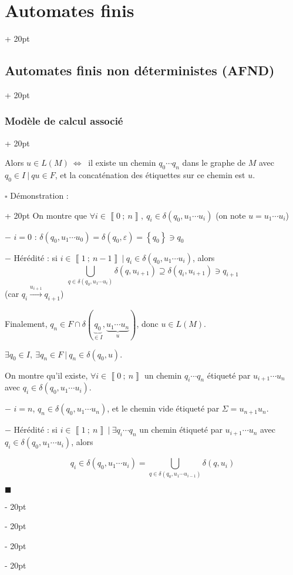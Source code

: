 \documentclass[a4paper, 12pt, twoside]{article}
\newcommand{\nset}[2]{\left\llbracket #1\ ;\ #2 \right\rrbracket}
\newcommand{\set}[1]{\left\{ #1 \right\}}
\newcommand{\ssi}{\ \Leftrightarrow \ }
\newcommand{\ind}[1][20pt]{\advance\leftskip + #1}
\newcommand{\deind}[1][20pt]{\advance\leftskip - #1}
\newenvironment{indt}[2][20pt]{#2 \par \ind[#1]}{\par \deind} %
\newenvironment{proof}[1][{Démonstration :}]{\begin{indt}{$\square$ #1}}{$\blacksquare$ \end{indt}}
\begin{document}
\begin{indt}{\section{Automates finis}}
\begin{indt}{\subsection{Automates finis non déterministes (AFND)}}
\begin{indt}{\subsubsection{Modèle de calcul associé}}
\begin{emphBox}
                    Alors $u \in L(M) \ssi$ il existe un chemin $q_0 \cdots q_n$ dans le graphe de $M$ avec $q_0 \in I\ |\ qu \in F$, et la concaténation des étiquettes sur ce chemin est $u$.
                \end{emphBox}

                \vspace{6pt}
                
                \begin{proof}
                    \boxed{\Leftarrow} On montre que $\forall i \in \nset 0 n,\ q_i \in \delta(q_0, u_1 \cdots u_i)$ (on note $u = u_1 \cdots u_i$)

                    $-$ $i = 0$ : $\delta(q_0, u_1 \cdots u_0) = \delta(q_0, \varepsilon) = \set{q_0} \ni q_0$

                    $-$ Hérédité : si $i \in \nset 1 {n - 1}\ |\ q_i \in \delta(q_0, u_1 \cdots u_i)$, alors
                    \[
                        \bigcup_{q \in \delta(q_0, u_1 \cdots u_i)} \delta(q, u_{i + 1}) \supseteq \delta(q_i, u_{i + 1}) \ni q_{i + 1}
                    \]
                    (car $q_i \overset{u_{i + 1}}\longrightarrow q_{i + 1}$)

                    Finalement, $q_n \in F \cap \delta(\underbrace{q_0}_{\in I}, \underbrace{u_1 \cdots u_n}_u)$, donc $u \in L(M)$.

                    \vspace{12pt}
                    
                    \boxed{\Rightarrow} $\exists q_0 \in I,\ \exists q_n \in F\ |\ q_n \in \delta(q_0, u)$.

                    On montre qu'il existe, $\forall i \in \nset 0 n$ un chemin $q_i \cdots q_n$ étiqueté par $u_{i + 1} \cdots u_n$ avec $q_i \in \delta(q_0, u_1 \cdots u_i)$.

                    \vspace{6pt}
                    
                    $-$ $i = n$, $q_n \in \delta(q_0, u_1 \cdots u_n)$, et le chemin vide étiqueté par $\Sigma = u_{n + 1}u_n$.

                    \vspace{6pt}
                    
                    $-$ Hérédité : si $i \in \nset 1 n\ |\ \exists q_i \cdots q_n$ un chemin étiqueté par $u_{i + 1} \cdots u_n$ avec $q_i \in \delta(q_0, u_1 \cdots u_i)$, alors

                    \[
                        q_i \in \delta(q_0, u_1 \cdots u_i) = \bigcup_{q \in \delta(q_0, u_1 \cdots u_{i - 1})} \delta(q, u_i)
                    \]


\end{proof}
\end{indt}
\end{indt}
\end{indt}
\end{document}
